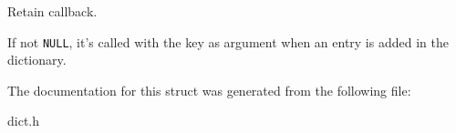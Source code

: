 Retain callback. 

If not {\tt NULL}, it's called with the key as argument when an entry is added in the dictionary. 

The documentation for this struct was generated from the following file:\begin{CompactItemize}
\item 
dict.h\end{CompactItemize}

